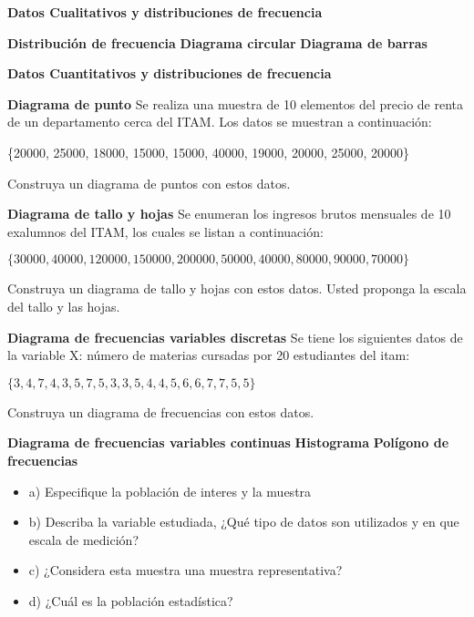 \documentclass{oxmathproblems}
\begin{document}
\begin{questions}

\miquestion \textbf{Datos Cualitativos y distribuciones de frecuencia}

\textbf{Distribución de frecuencia}
\textbf{Diagrama circular}
\textbf{Diagrama de barras}

\miquestion \textbf{Datos Cuantitativos y distribuciones de frecuencia}

\textbf{Diagrama de punto}
Se realiza una muestra de 10 elementos del precio de renta de un departamento cerca del ITAM. Los datos se muestran a continuación:

\{20000, 25000, 18000, 15000, 15000, 40000, 19000, 20000, 25000, 20000\}

Construya un diagrama de puntos con estos datos.

\textbf{Diagrama de tallo y hojas}
Se enumeran los ingresos brutos mensuales de 10 exalumnos del ITAM, los cuales se listan a continuación:

$\{30000, 40000, 120000, 150000, 200000, 50000, 40000, 80000, 90000, 70000\}$

Construya un diagrama de tallo y hojas con estos datos. Usted proponga la escala del tallo y las hojas.


\textbf{Diagrama de frecuencias variables discretas}
Se tiene los siguientes datos de la variable X: número de materias cursadas por 20 estudiantes del itam:

$\{3,4,7,4,3,5,7,5,3,3,5,4,4,5,6,6,7,7,5,5\}$

Construya un diagrama de frecuencias con estos datos.

\textbf{Diagrama de frecuencias variables continuas}
\textbf{Histograma}
\textbf{Polígono de frecuencias}



\begin{itemize}
\item a) Especifique la población de interes y la muestra
\item b) Describa la variable estudiada, ¿Qué tipo de datos son utilizados y en que escala de medición?
\item c) ¿Considera esta muestra una muestra representativa?
\item d) ¿Cuál es la población estadística?
\end{itemize}

\end{questions}
\end{document}
